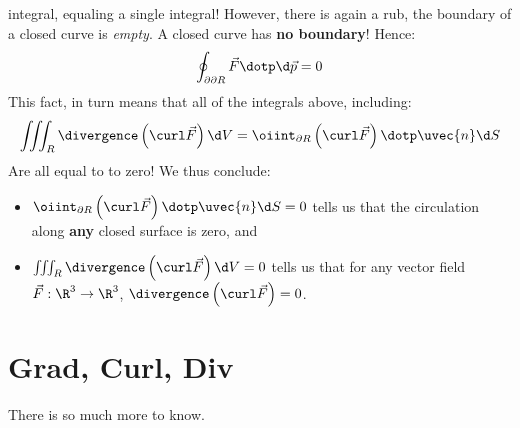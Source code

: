 \documentclass{ximera}
\begin{document}
integral, equaling a single integral! However, there is again a rub,
the boundary of a closed curve is \textit{empty}. A closed curve has
\textbf{no boundary}! Hence:
\[
\oint_{\partial\partial R} \vec{F}\dotp \d \vec{p} = 0
\]
This fact, in turn means that all of the integrals above, including:
\[
\iiint_R \divergence\left(\curl\vec{F}\right)\d V = \oiint_{\partial R} \left(\curl \vec{F}\right)\dotp \uvec{n} \d S
\]
Are all equal to to zero!  We thus conclude:
\begin{itemize}
\item $\oiint_{\partial R} \left(\curl \vec{F}\right)\dotp \uvec{n} \d
  S=0$ tells us that the circulation along \textbf{any} closed surface
  is zero, and
\item $\iiint_R \divergence\left(\curl\vec{F}\right)\d V = 0$ tells us
  that for any vector field $\vec{F}:\R^3\to\R^3$,
  $\divergence\left(\curl\vec{F}\right)=0$.
\end{itemize}



\section{Grad, Curl, Div}



  


There is so much more to know. 
\end{document}

